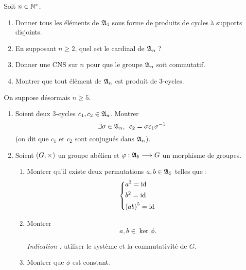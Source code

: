\begin{corr}
\end{corr}

\begin{exo}
Soit \(n\in\mathbb{N}^*\).

\begin{enumerate}[series=exoAn]
\item Donner tous les éléments de \(\frak{A}_{4}\) sous forme de produits de cycles à supports disjoints. \\

\item En supposant \(n\geq2\), quel est le cardinal de \(\frak{A}_{n}\) ? \\

\item Donner une CNS sur \(n\) pour que le groupe \(\frak{A}_{n}\) soit commutatif. \\

\item Montrer que tout élément de \(\frak{A}_{n}\) est produit de \(3\)-cycles.
\end{enumerate}

On suppose désormais \(n\geq5\).

\begin{enumerate}[resume=exoAn]
\item Soient deux \(3\)-cycles \(c_1,c_2\in\frak{A}_{n}\). Montrer \[\quantifs{\exists\sigma\in\frakA{n}}c_2=\sigma c_1\sigma\inv\] (on dit que \(c_1\) et \(c_2\) sont conjugués dans \(\frak{A}_{n}\)). \\

\item Soient \(\groupe{G}[\times]\) un groupe abélien et \(\varphi:\frak{A}_{5}\longrightarrow G\) un morphisme de groupes.

\begin{enumerate}
\item Montrer qu'il existe deux permutations \(a,b\in\frak{A}_{5}\) telles que : \[\begin{dcases}a^3=\mathrm{id}_{} \\ b^2=\mathrm{id}_{} \\ \left(ab\right)^5=\mathrm{id}_{}\end{dcases}\]

\item Montrer \[a,b\in\ker\phi.\]

\textit{Indication :} utiliser le système et la commutativité de \(G\). \\

\item Montrer que \(\phi\) est constant. \\
\end{enumerate}


\end{enumerate}
\end{exo}
